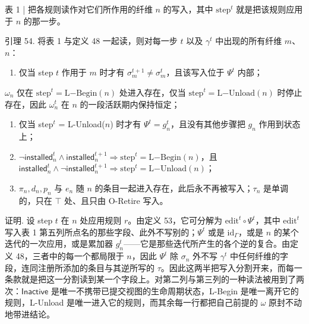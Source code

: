 \documentclass[
  10
]{article}
\providecommand{\tightlist}{%
  \setlength{\itemsep}{0pt}\setlength{\parskip}{0pt}}
\begin{document}
表 1 | 把各规则读作对它们所作用的纤维 $n$ 的写入，其中 $\mathrm{step}^{t}$ 就是把该规则应用于 $n$ 的那一步。

引理 54. 将表 1 与定义 48 一起读，则对每一步 $t$ 以及 $\gamma ^ { t }$ 中出现的所有纤维 $m$、$n$：

\begin{enumerate}
\def\labelenumi{\arabic{enumi}.}
\tightlist
\item
  仅当 step $t$ 作用于 $m$ 时才有 $\sigma _ { m } ^ { t + 1 } \neq \sigma _ { m } ^ { t }$，且该写入位于 $\Psi ^ { t }$ 内部；
\end{enumerate}

$\omega _ { n }$ 仅在 $\mathrm { s t e p } ^ { t } = \mathrm { L } \mathrm { - B e g i n } ( n )$ 处进入存在，仅当 $\mathrm { s t e p } ^ { t } = \mathrm { L } \mathrm { - U n l o a d } ( n )$ 时停止存在，因此 $\omega _ { n } ^ { t }$ 在 $n$ 的一段活跃期内保持恒定；

\begin{enumerate}
\def\labelenumi{\arabic{enumi}.}
\setcounter{enumi}{2}
\item
  仅当 step$^t$ = L-Unload($n$) 时才有 $\Psi ^ { t } = g _ { n } ^ { t }$，且没有其他步骤把 $g _ { n }$ 作用到状态上；
\item
  $\neg \mathsf{installed}_{n}^{t} \wedge \mathsf{installed}_{n}^{t + 1} \Rightarrow \mathrm { s t e p } ^ { t } = \mathrm { L } \mathrm { - B e g i n } ( n )$，且 $\mathsf{installed}_{n}^{t} \wedge \neg \mathsf{installed}_{n}^{t + 1} \Rightarrow \mathrm { s t e p } ^ { t } = \mathrm { L } \mathrm { - U n l o a d } ( n )$；
\item
  $\pi _ { n } , d _ { n } , p _ { n }$ 与 $e _ { n }$ 随 $n$ 的条目一起进入存在，此后永不再被写入；$\tau _ { n }$ 是单调的，只在 $\top$ 处、且只由 O-Retire 写入。
\end{enumerate}

证明. 设 step $t$ 在 $n$ 处应用规则 $r$。由定义 53，它可分解为 $\mathrm{edit}^{t} \circ \Psi ^ { t }$，其中 $\mathrm{edit}^{t}$ 写入表 1 第五列所点名的那些字段、此外不写别的；$\Psi ^ { t }$ 或是 $\mathrm { i d } _ { \Gamma }$，或是 $n$ 的某个迭代的一次应用，或是累加器 $g _ { n } ^ { t }$——它是那些迭代所产生的各个逆的复合。由定义 48，三者中的每一个都局限于 $n$，因此 $\Psi ^ { t }$ 除 $\sigma _ { n }$ 外不写 $\gamma ^ { t }$ 中任何纤维的字段，连同注册所添加的条目与其逆所写的 $\tau$。因此这两半把写入分割开来，而每一条款就是把这一分割读到某一个字段上。对第二列与第三列的一种读法被用到了两次：$\mathsf{Inactive}$ 是唯一不携带已提交视图的生命周期状态，L-Begin 是唯一离开它的规则，L-Unload 是唯一进入它的规则，而其余每一行都把自己前提的 $\omega$ 原封不动地带进结论。
\end{document}
